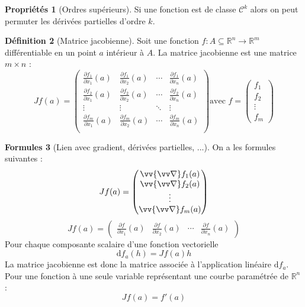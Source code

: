 \documentclass[11pt,a4paper]{article}
\theoremstyle{definition}
\newtheorem{mydef}{Définition}[section]
\newtheorem{myprop}[mydef]{Propriétés}
\newtheorem{myform}[mydef]{Formules}
\newcommand{\R}{\mathbb{R}}
\newcommand{\dif}{\mathrm{d}}
\let\oldnabla\nabla
\renewcommand{\nabla}{\vv{\oldnabla}}
\newcommand{\fl}{\rightarrow}
\newcommand{\pa}{\partial}
\begin{document}
\begin{myprop}[Ordres supérieurs]
Si une fonction est de classe $\mathcal{C}^k$ alors on peut permuter les dérivées partielles d'ordre $k$.
\end{myprop}

\begin{mydef}[Matrice jacobienne]
Soit une fonction $f : A \subseteq \R^n \fl \R^m$ différentiable en un point $a$ intérieur à $A$. La matrice jacobienne est une matrice $m \times n$ :
\[ Jf(a) = \begin{pmatrix}
\frac{\pa f_1}{\pa x_1}(a) & \frac{\pa f_1}{\pa x_2}(a) & \cdots & \frac{\pa f_1}{\pa x_n}(a) \\
\frac{\pa f_2}{\pa x_1}(a) & \frac{\pa f_2}{\pa x_2}(a) & \cdots & \frac{\pa f_2}{\pa x_n}(a) \\
\vdots & \vdots & \ddots & \vdots \\
\frac{\pa f_m}{\pa x_1}(a) & \frac{\pa f_m}{\pa x_2}(a) & \cdots & \frac{\pa f_m}{\pa x_n}(a) \\
\end{pmatrix} \text{avec } f = \begin{pmatrix} f_1 \\ f_2 \\ \vdots \\ f_m \end{pmatrix} \]
\end{mydef}

\begin{myform}[Lien avec gradient, dérivées partielles, ...]
On a les formules suivantes :
\[ Jf(a) = \begin{pmatrix} \nabla f_1(a) \\ \nabla f_2(a) \\ \vdots \\ \nabla f_m(a) \end{pmatrix} \]
\[ Jf(a) = \begin{pmatrix} \frac{\pa f}{\pa x_1}(a) & \frac{\pa f}{\pa x_2}(a) & \cdots & \frac{\pa f}{\pa x_n}(a) \end{pmatrix} \]
Pour chaque composante scalaire d'une fonction vectorielle
\[ \dif f_a(h) = Jf(a) h \]
La matrice jacobienne est donc la matrice associée à l'application linéaire $\dif f_a$.
Pour une fonction à une seule variable représentant une courbe paramétrée de $\R^n$ :
\[ Jf(a) = f'(a) \]
\end{myform}

\end{document}
